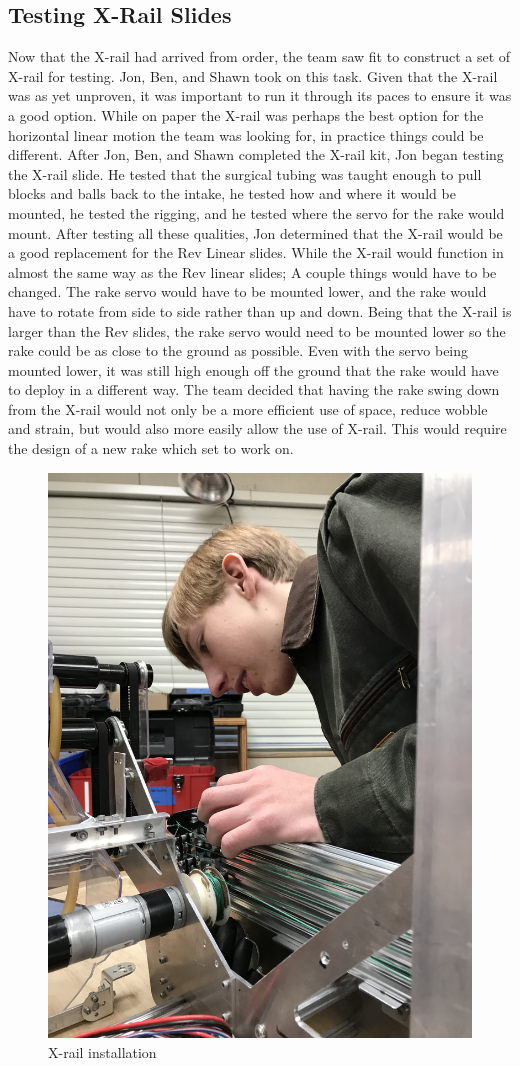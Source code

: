 \documentclass{article}
\begin{document}
\subsection{Testing X-Rail Slides}
Now that the X-rail had arrived from order, the team saw fit to construct a set of X-rail for testing. Jon, Ben, and Shawn took on this task. Given that the X-rail was as yet unproven, it was important to run it through its paces to ensure it was a good option. While on paper the X-rail was perhaps the best option for the horizontal linear motion the team was looking for, in practice things could be different. After Jon, Ben, and Shawn completed the X-rail kit, Jon began testing the X-rail slide. He tested that the surgical tubing was taught enough to pull blocks and balls back to the intake, he tested how and where it would be mounted, he tested the rigging, and he tested where the servo for the rake would mount. After testing all these qualities, Jon determined that the X-rail would be a good replacement for the Rev Linear slides. While the X-rail would function in almost the same way as the Rev linear slides; A couple things would have to be changed. The rake servo would have to be mounted lower, and the rake would have to rotate from side to side rather than up and down. Being that the X-rail is larger than the Rev slides, the rake servo would need to be mounted lower so the rake could be as close to the ground as possible. Even with the servo being mounted lower, it was still high enough off the ground that the rake would have to deploy in a different way. The team decided that having the rake swing down from the X-rail would not only be a more efficient use of space, reduce wobble and strain, but would also more easily allow the use of X-rail. This would require the design of a new rake which set to work on. 

\begin{figure}
    \centering
    \includegraphics[width=.6 \textwidth]{15_12-10/images/IMG_8107[1].jpg}
    \caption{X-rail installation}
    \label{fig:my_label}
\end{figure}
\end{document}
